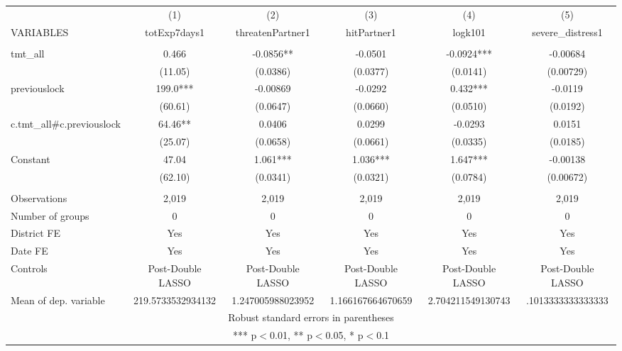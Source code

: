 \documentclass[]{article}
\begin{document}
\begin{tabular}{lccccc} \hline
 & (1) & (2) & (3) & (4) & (5) \\
VARIABLES & totExp7days1 & threatenPartner1 & hitPartner1 & logk101 & severe\_distress1 \\ \hline
 &  &  &  &  &  \\
tmt\_all & 0.466 & -0.0856** & -0.0501 & -0.0924*** & -0.00684 \\
 & (11.05) & (0.0386) & (0.0377) & (0.0141) & (0.00729) \\
previouslock & 199.0*** & -0.00869 & -0.0292 & 0.432*** & -0.0119 \\
 & (60.61) & (0.0647) & (0.0660) & (0.0510) & (0.0192) \\
c.tmt\_all\#c.previouslock & 64.46** & 0.0406 & 0.0299 & -0.0293 & 0.0151 \\
 & (25.07) & (0.0658) & (0.0661) & (0.0335) & (0.0185) \\
Constant & 47.04 & 1.061*** & 1.036*** & 1.647*** & -0.00138 \\
 & (62.10) & (0.0341) & (0.0321) & (0.0784) & (0.00672) \\
 &  &  &  &  &  \\
Observations & 2,019 & 2,019 & 2,019 & 2,019 & 2,019 \\
Number of groups & 0 & 0 & 0 & 0 & 0 \\
District FE & Yes & Yes & Yes & Yes & Yes \\
Date FE & Yes & Yes & Yes & Yes & Yes \\
Controls & Post-Double LASSO & Post-Double LASSO & Post-Double LASSO & Post-Double LASSO & Post-Double LASSO \\
 Mean of dep. variable & 219.5733532934132 & 1.247005988023952 & 1.166167664670659 & 2.704211549130743 & .1013333333333333 \\ \hline
\multicolumn{6}{c}{ Robust standard errors in parentheses} \\
\multicolumn{6}{c}{ *** p$<$0.01, ** p$<$0.05, * p$<$0.1} \\
\end{tabular}
\end{document}
